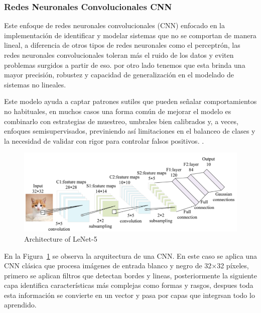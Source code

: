 \documentclass[11pt,a4paper,spanish]{book}
\numberwithin{equation}{chapter}
\numberwithin{figure}{chapter}
\begin{document}
\subsubsection{Redes Neuronales Convolucionales CNN}


Este enfoque de redes neuronales convolucionales (CNN) enfocado en la implementación de identificar y modelar sistemas que no se comportan de manera lineal, a diferencia de otros tipos de redes neuronales como el perceptrón, las redes neuronales convolucionales toleran más el ruido de los datos y eviten problemas surgidos a partir de eso. por otro lado tenemos que esta brinda una mayor precisión, robustez y capacidad de generalización en el modelado de sistemas no lineales. \cite{LopezPacheco2017}


Este modelo ayuda a captar patrones sutiles que pueden señalar comportamientos no habituales, en muchos casos una forma común de mejorar el modelo es combinarlo con estrategias de muestreo, umbrales bien calibrados y, a veces, enfoques semisupervisados, previniendo así limitaciones en el balanceo de clases y la necesidad de validar con rigor para controlar falsos positivos. \cite{ameijeiras2021algoritmos}.


\begin{figure}[h]
    \centering
    \includegraphics[width=1.0\textwidth]{media/lenet-o5.png}
    \caption{Architecture of LeNet-5  \protect\cite{Zhao2024review}}
    \label{fig:figLenet}
\end{figure}


En la Figura~\ref{fig:figLenet} se observa la arquitectura de una CNN. En este caso se aplica una CNN clásica que procesa imágenes de entrada blanco y negro de 32×32 píxeles, primero se aplican filtros que detectan bordes y lineas, posteriormente la siguiente capa identifica características más complejas como formas y rasgos, despues toda esta información se convierte en un vector y pasa por capas que integrsan todo lo aprendido. \cite{Zhao2024review}
\end{document}
